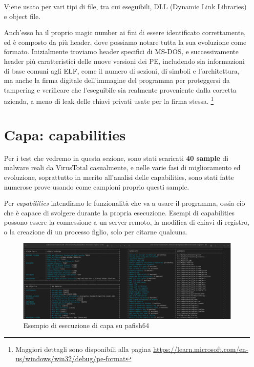 Viene usato per vari tipi di file, tra cui eseguibili, DLL (Dynamic Link Libraries) e object file.

Anch'esso ha il proprio magic number ai fini di essere identificato correttamente, ed è composto da più header, dove possiamo notare tutta la sua evoluzione come formato. Inizialmente troviamo header specifici di MS-DOS, e successivamente header più caratteristici delle nuove versioni dei PE, includendo sia informazioni di base comuni agli ELF, come il numero di sezioni, di simboli e l'architettura, ma anche la firma digitale dell'immagine del programma per proteggersi da tampering e verificare che l'eseguibile sia realmente proveniente dalla corretta azienda, a meno di leak delle chiavi privati usate per la firma stessa.
\footnote{Maggiori dettagli sono disponibili alla pagina \url{https://learn.microsoft.com/en-us/windows/win32/debug/pe-format}}

\section{Capa: capabilities}
Per i test che vedremo in questa sezione, sono stati scaricati \textbf{40 sample} di malware reali da VirusTotal casualmente, e nelle varie fasi di miglioramento ed evoluzione, soprattutto in merito all'analisi delle capabilities, sono stati fatte numerose prove usando come campioni proprio questi sample.

Per \emph{capabilities} intendiamo le funzionalità che va a usare il programma, ossia ciò che è capace di svolgere durante la propria esecuzione. Esempi di capabilities possono essere la connessione a un server remoto, la modifica di chiavi di registro, o la creazione di un processo figlio, solo per citarne qualcuna.

\begin{figure}[!htb]
    \centering
    \includegraphics[width=\textwidth]{assets/capa_example_invocation.png}
    \caption{Esempio di esecuzione di capa su pafish64}
    \label{fig:capa_example_invocation}
\end{figure}

